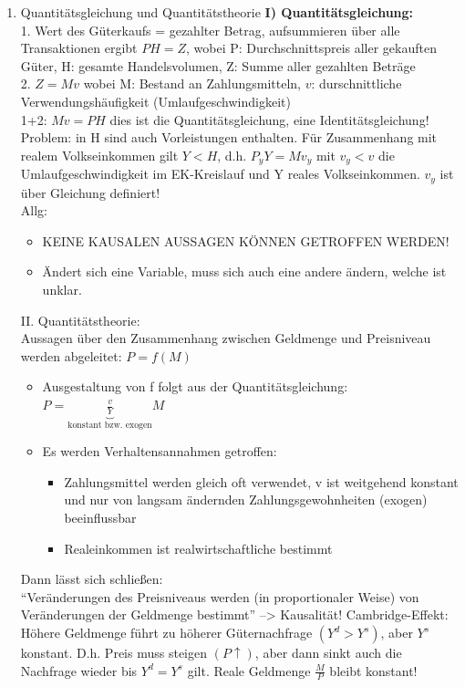 \documentclass{scrartcl}
\begin{document}
\begin{enumerate}
\item Quantit\"{a}tsgleichung und Quantit\"{a}tstheorie
\textbf{I) Quantit\"{a}tsgleichung:}\\
1. Wert des G\"{u}terkaufs = gezahlter Betrag, aufsummieren \"{u}ber alle Transaktionen ergibt $P H = Z$, wobei P: Durchschnittspreis aller gekauften G\"{u}ter, H: gesamte Handelsvolumen, Z: Summe aller gezahlten Betr\"{a}ge\\
2. $Z=Mv$ wobei M: Bestand an Zahlungsmitteln, $v$: durschnittliche Verwendungsh\"{a}ufigkeit (Umlaufgeschwindigkeit)\\
1+2: $M v = PH$ dies ist die Quantit\"{a}tsgleichung, eine Identit\"{a}tsgleichung! Problem: in H sind auch Vorleistungen enthalten. F\"{u}r Zusammenhang mit realem Volkseinkommen gilt $Y<H$, d.h. $P_y Y= M v_y$ mit $v_y<v$ die Umlaufgeschwindigkeit im EK-Kreislauf und Y reales Volkseinkommen. $v_y$ ist \"{u}ber Gleichung definiert!\\
Allg:\\
\begin{itemize}
\item KEINE KAUSALEN AUSSAGEN K\"{O}NNEN GETROFFEN WERDEN!
\item \"{A}ndert sich eine Variable, muss sich auch eine andere \"{a}ndern, welche ist unklar.
\end{itemize}
II. Quantit\"{a}tstheorie:\\
Aussagen \"{u}ber den Zusammenhang zwischen Geldmenge und Preisniveau werden abgeleitet: $P=f(M)$
\begin{itemize}
\item Ausgestaltung von f folgt aus der Quantit\"{a}tsgleichung: $P = \underbrace{\frac{v}{Y}}_\text{konstant bzw. exogen} M$
\item Es werden Verhaltensannahmen getroffen:
\begin{itemize}
\item Zahlungsmittel werden gleich oft verwendet, v ist weitgehend konstant und nur von langsam \"{a}ndernden Zahlungsgewohnheiten (exogen) beeinflussbar
\item Realeinkommen ist realwirtschaftliche bestimmt
\end{itemize}
\end{itemize}
Dann l\"{a}sst sich schlie{\ss}en:\\
\enquote{Ver\"{a}nderungen des Preisniveaus werden (in proportionaler Weise) von Ver\"{a}nderungen der Geldmenge bestimmt} --> Kausalit\"{a}t!
Cambridge-Effekt: H\"{o}here Geldmenge f\"{u}hrt zu h\"{o}herer G\"{u}ternachfrage $(Y^d>Y^s)$, aber $Y^s$ konstant. D.h. Preis muss steigen $(P\uparrow)$, aber dann sinkt auch die Nachfrage wieder bis $Y^d=Y^s$ gilt. Reale Geldmenge $\frac{M}{P}$ bleibt konstant!


\end{enumerate}
\end{document}
